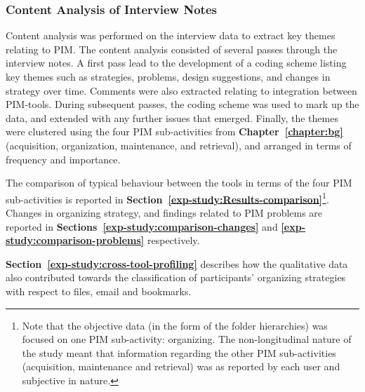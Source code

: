 \subsubsection{Content Analysis of Interview Notes}
Content analysis was performed on the interview data to extract key themes relating to PIM.
The content analysis consisted of several passes through the interview notes. A first pass lead to the development of a coding scheme listing key themes such as strategies, problems, design suggestions, and changes in strategy over time. Comments were also extracted relating to integration between PIM-tools. %
During subsequent passes, the coding scheme was used to mark up the data, and extended with any further issues that emerged.  Finally, the themes were clustered using the four PIM sub-activities from
\textbf{Chapter~\ref{chapter:bg}} (acquisition, organization, maintenance, and retrieval), and arranged in terms of frequency and importance. %

The comparison of typical behaviour between the tools in terms of the four PIM sub-activities is reported in \textbf{Section~\ref{exp-study:Results-comparison}}\footnote{Note that the objective data (in the form of the folder hierarchies) was focused on one PIM sub-activity: organizing.  The non-longitudinal nature of the study meant that information regarding the other PIM sub-activities (acquisition, maintenance and retrieval) was as reported by each user and subjective in nature.}.  Changes in organizing strategy, and findings related to PIM problems are reported in \textbf{Sections~\ref{exp-study:comparison-changes}} and \textbf{\ref{exp-study:comparison-problems}} respectively.

\textbf{Section~\ref{exp-study:cross-tool-profiling}} describes how the qualitative data also contributed towards the classification of participants' organizing strategies with respect to files, email and bookmarks.

